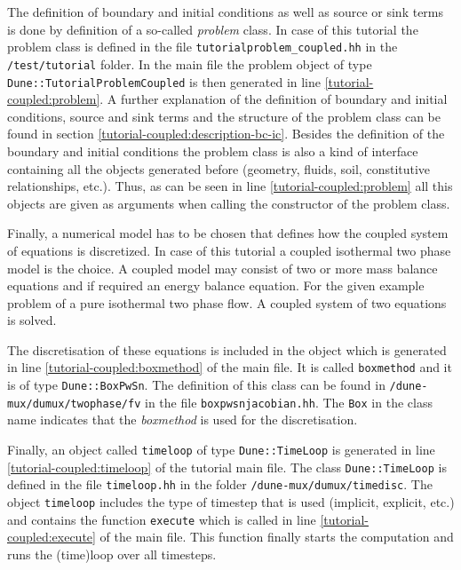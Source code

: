 The definition of boundary and initial conditions as well as source or sink terms is done by definition of a so-called \textit{problem} class. In case of this tutorial the problem class is defined in the file \texttt{tutorialproblem\_coupled.hh} in the \texttt{/test/tutorial} folder. In the main file the problem object of type \texttt{Dune::TutorialProblemCoupled} is then generated in line \ref{tutorial-coupled:problem}. A further explanation of the definition of boundary and initial conditions, source and sink terms and the structure of the problem class can be found in section \ref{tutorial-coupled:description-bc-ic}. Besides the definition of the boundary and initial conditions the problem class is also a kind of interface containing all the objects generated before (geometry, fluids, soil, constitutive relationships, etc.). Thus, as can be seen in line \ref{tutorial-coupled:problem} all this objects are given as arguments when calling the constructor of the problem class.     

Finally, a numerical model has to be chosen that defines how the coupled system of equations is discretized. In case of this tutorial a coupled isothermal two phase model is the choice. A coupled model may consist of two or more mass balance equations and if required an energy balance equation. For the given example problem of a pure isothermal two phase flow. A coupled system of two equations is solved. 

The discretisation of these equations is included in the object which is generated in line \ref{tutorial-coupled:boxmethod} of the main file. It is called \texttt{boxmethod} and it is of type \texttt{Dune::BoxPwSn}. The definition of this class can be found in \texttt{/dune-mux/dumux/twophase/fv} in the file \texttt{boxpwsnjacobian.hh}. The \texttt{Box} in the class name indicates that the \textit{boxmethod} is used for the discretisation. 

Finally, an object called \texttt{timeloop} of type \texttt{Dune::TimeLoop} is generated in line \ref{tutorial-coupled:timeloop} of the tutorial main file. The class \texttt{Dune::TimeLoop} is defined in the file \texttt{timeloop.hh} in the folder \texttt{/dune-mux/dumux/timedisc}. The object \texttt{timeloop} includes the type of timestep that is used (implicit, explicit, etc.) and contains the function \texttt{execute} which is called in line \ref{tutorial-coupled:execute} of the main file. This function finally starts the computation and runs the (time)loop over all timesteps.

